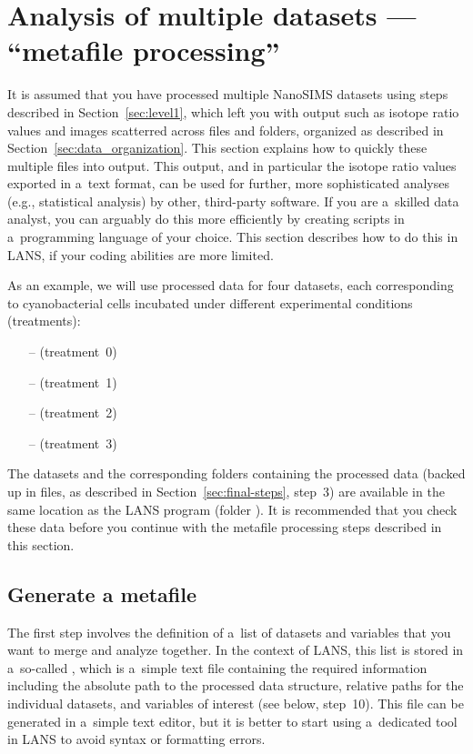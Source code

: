 \section{Analysis of multiple datasets --- ``metafile processing''}
\label{sec:level2}

\purplebox{}
It is assumed that you have processed multiple NanoSIMS datasets using steps described in Section~\ref{sec:level1}, which left you with output such as isotope ratio values and images scatterred across  files and folders, organized as described in Section~\ref{sec:data_organization}. This section explains how to quickly  these multiple files into  output. This output, and in particular the isotope ratio values exported in a~text format, can be used for further, more sophisticated analyses (e.g., statistical analysis) by other, third-party software. If you are a~skilled data analyst, you can arguably do this more efficiently by creating scripts in a~programming language of your choice. This section describes how to do this in LANS, if your coding abilities are more limited.
\tcbe

As an example, we will use processed data for four datasets, each corresponding to cyanobacterial cells incubated under different experimental conditions (treatments): 
\begin{itemize}
\item[--] (treatment~0)
\item[--] (treatment~1)
\item[--] (treatment~2)
\item[--] (treatment~3)
\end{itemize}
The datasets and the corresponding folders containing the processed data (backed up in  files, as described in Section~\ref{sec:final-steps}, step~3) are available in the same location as the LANS program (folder ). It is recommended that you check these data before you continue with the metafile processing steps described in this section.


\subsection{Generate a metafile}
\setcounter{step}{0}

\goldbox{}
The first step involves the definition of a~list of datasets and variables that you want to merge and analyze together. In the context of LANS, this list is stored in a~so-called , which is a~simple text file containing the required information including the absolute path to the processed data structure, relative paths for the individual datasets, and variables of interest (see below, step~10). This file can be generated in a~simple text editor, but it is better to start using a~dedicated tool in LANS to avoid syntax or formatting errors.
\tcbe

